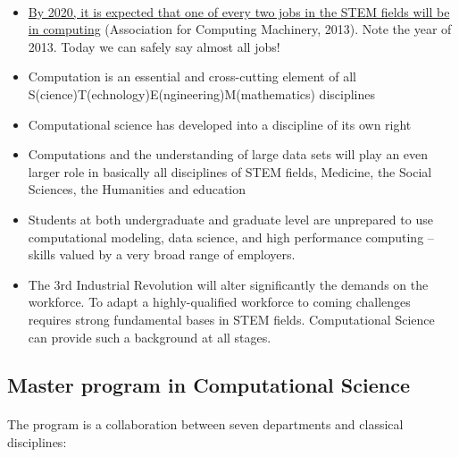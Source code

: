 \documentclass[%
oneside,                 %
final,                   %
10pt]{article}
\begin{document}
\paragraph{}
\begin{itemize}
\item \href{{http://pathways.acm.org/executive-summary.html}}{By 2020, it is expected that one of every two jobs in the STEM fields will be in computing} (Association for Computing Machinery, 2013). Note the year of 2013. Today we can safely say almost all jobs!

\item Computation is an essential and cross-cutting element of all S(cience)T(echnology)E(ngineering)M(mathematics) disciplines

\item Computational science has developed into a discipline of its own right

\item Computations and the understanding of large data sets will play an even larger role in basically all disciplines of STEM fields, Medicine, the Social Sciences, the Humanities and  education

\item Students at both undergraduate and graduate level are unprepared to use computational modeling, data science, and high performance computing – skills valued by a very broad range of employers.

\item The 3rd Industrial Revolution will alter significantly the demands on the workforce. To adapt a highly-qualified workforce to coming challenges  requires strong fundamental bases in STEM fields. Computational Science can provide such a background at all stages.
\end{itemize}

\noindent




\subsection{Master program in Computational Science}

\paragraph{}

The program is a collaboration between seven departments and classical disciplines:
\end{document}
